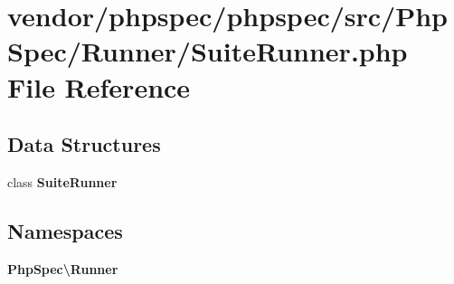 \section{vendor/phpspec/phpspec/src/\+Php\+Spec/\+Runner/\+Suite\+Runner.php File Reference}
\label{_suite_runner_8php}
\subsection*{Data Structures}
\begin{DoxyCompactItemize}
\item 
class {\bf Suite\+Runner}
\end{DoxyCompactItemize}
\subsection*{Namespaces}
\begin{DoxyCompactItemize}
\item 
 {\bf Php\+Spec\textbackslash{}\+Runner}
\end{DoxyCompactItemize}
